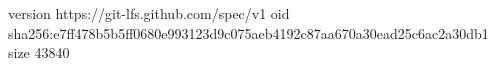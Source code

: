 version https://git-lfs.github.com/spec/v1
oid sha256:e7ff478b5b5ff0680e993123d9c075aeb4192c87aa670a30ead25c6ac2a30db1
size 43840
